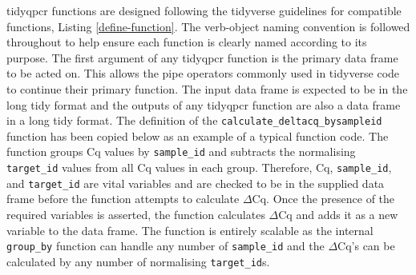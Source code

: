 \documentclass[../main.tex]{subfiles}
\begin{document}
tidyqpcr functions are designed following the tidyverse guidelines for compatible functions, Listing \ref{define-function}. 
The verb-object naming convention is followed throughout to help ensure each function is clearly named according to its purpose. 
The first argument of any tidyqpcr function is the primary data frame to be acted on. 
This allows the pipe operators commonly used in tidyverse code to continue their primary function. 
The input data frame is expected to be in the long tidy format and the outputs of any tidyqpcr function are also a data frame in a long tidy format. 
The definition of the \lstinline{calculate_deltacq_bysampleid} function has been copied below as an example of a typical function code. 
The function groups Cq values by \lstinline{sample_id} and subtracts the normalising \lstinline{target_id} values from all Cq values in each group. 
Therefore, Cq, \lstinline{sample_id}, and \lstinline{target_id} are vital variables and are checked to be in the supplied data frame before the function attempts to calculate $\Delta$Cq. 
Once the presence of the required variables is asserted, the function calculates $\Delta$Cq and adds it as a new variable to the data frame. 
The function is entirely scalable as the internal \lstinline{group_by} function can handle any number of \lstinline{sample_id} and the $\Delta$Cq's can be calculated by any number of normalising \lstinline{target_id}s.
\end{document}
